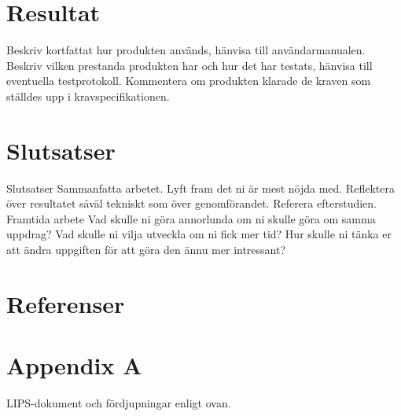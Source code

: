﻿\documentclass[a4paper,12pt,fleqn]{article}
\begin{document}
\section{Resultat}
Beskriv kortfattat hur produkten används, hänvisa till användarmanualen.
Beskriv vilken prestanda produkten har och hur det har testats, hänvisa till eventuella testprotokoll.
Kommentera om produkten klarade de kraven som ställdes upp i kravspecifikationen. 
\section{Slutsatser}
Slutsatser
Sammanfatta arbetet. 
Lyft fram det ni är mest nöjda med.
Reflektera över resultatet såväl tekniskt som över genomförandet. Referera efterstudien.
Framtida arbete
Vad skulle ni göra annorlunda om ni skulle göra om samma uppdrag?
Vad skulle ni vilja utveckla om ni fick mer tid?
Hur skulle ni tänka er att ändra uppgiften för att göra den ännu mer intressant?
\section{Referenser}



\newpage
\appendix
\pagestyle{empty}
\section{Appendix A}
LIPS-dokument och fördjupningar enligt ovan.
\end{document}
